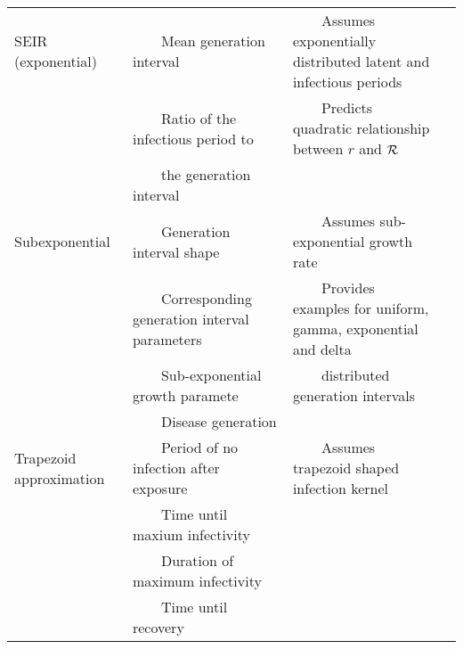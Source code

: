 \documentclass[12pt, landscape]{article}
\newcommand{\RR}{\ensuremath{{\cal R}}}
\newcommand{\tabitem}{~~\llap{\textbullet}~~}
\newcommand{\tabphant}{\hphantom\tabitem}
\begin{document}
\begin{table}
\begin{tabular}{l|l|l|c}
\hline
SEIR (exponential) & \tabitem Mean generation interval & \tabitem Assumes exponentially distributed latent and infectious periods & \cite{lipsitch2003transmission, chowell2007comparative, roberts2007model} \\
& \tabitem Ratio of the infectious period to & \tabitem Predicts quadratic relationship between $r$ and \RR\ & \\
& \tabphant the generation interval & & \\
\hline
Subexponential & \tabitem Generation interval shape & \tabitem Assumes sub-exponential growth rate & \cite{chowell2016characterizing} \\
& \tabitem Corresponding generation interval parameters & \tabitem Provides examples for uniform, gamma, exponential and delta &\\
& \tabitem Sub-exponential growth paramete & \tabphant distributed generation intervals & \\
& \tabitem Disease generation & & \\
\hline
Trapezoid approximation & \tabitem Period of no infection after exposure & \tabitem Assumes trapezoid shaped infection kernel & \cite{roberts2007model} \\
& \tabitem Time until maxium infectivity& & \\
& \tabitem Duration of maximum infectivity & & \\
& \tabitem Time until recovery & &\\
\hline
\end{tabular}
\end{table}

\clearpage
\pagebreak


\end{document}
